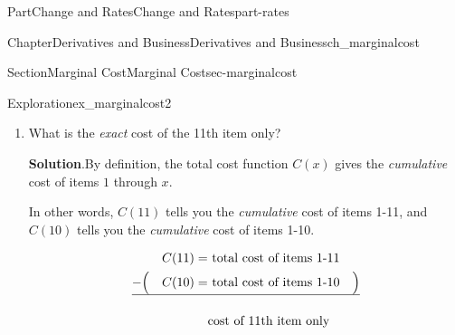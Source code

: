 \documentclass[oneside,10pt,]{tufte-book}
\newcommand{\blocktitlefont}{\relax}
\newcommand{\xreffont}{\relax}
\numberwithin{equation}{chapter}
\newcommand{\ddx}[1]{ \dfrac{d}{dx} \Big[ #1 \Big]  }
\newcommand{\amp}{&}
\begin{document}
\begin{partptx}{Part}{Change and Rates}{}{Change and Rates}{}{}{part-rates}
\begin{chapterptx}{Chapter}{Derivatives and Business}{}{Derivatives and Business}{}{}{ch_marginalcost}
\begin{sectionptx}{Section}{Marginal Cost}{}{Marginal Cost}{}{}{sec-marginalcost}
\begin{exploration}{Exploration}{}{ex_marginalcost2}
\begin{enumerate}[font=\bfseries,label=(\alph*),ref=\alph*]
\par\smallskip%
\noindent\textbf{\blocktitlefont Solution}.\hypertarget{ex_marginalcost2-2-2}{}\quad{}By \hyperref[defn_marginalcost]{Definition~{\xreffont\ref{defn_marginalcost}}}, when we are asked to \emph{approximate} the cost of the next item, we must find and use the marginal cost function.%
\par
To find the marginal cost function, use the derivative shortcuts%
\begin{align*}
C'(x) = \amp \ddx{ 120 + 5x - 0.1x^2 }\\
= \amp \ddx{120} + \ddx{5x} - \ddx{0.1x^2}\\
= \amp 0 + 5 - 0.1\cdot \ddx{x^2}\\
= \amp 5 - 0.1\cdot 2x\\
= \amp 5 - 0.2x
\end{align*}
%
\par
To use the marginal cost function, recall that%
\begin{equation*}
C'(x) = \text{ the APPROXIMATE cost of the NEXT item in \$/item }
\end{equation*}
We want to find the approximate cost of the 11th item. Item 11 is the item that is \emph{immediately after item 10}.%
\par
In other words, compute \(C'(10)\). That will tell us the approximate cost of the item \emph{after} 10, which is the 11th item.%
\begin{equation*}
C'(10) = 5 - 0.2\cdot 10 = 3
\end{equation*}
The 11th item will cost approximately 3\textdollar{}.%
\item{}What is the \emph{exact} cost of the 11th item only?%
\par\smallskip%
\noindent\textbf{\blocktitlefont Solution}.\hypertarget{ex_marginalcost2-3-2}{}\quad{}By definition, the total cost function \(C(x)\) gives the \emph{cumulative} cost of items \(1\) through \(x\).%
\par
In other words, \(C(11)\) tells you the \emph{cumulative} cost of items 1-11, and \(C(10)\) tells you the \emph{cumulative} cost of items 1-10.%
\par
%
\begin{align*}
\amp\amp C(11) = \amp \text{ total cost of items 1-11}  \amp \\
-\amp\Big(\amp C(10) = \amp \text{ total cost of items 1-10} \amp \Big) \\
\hline \\
\amp \amp \amp \text{cost of 11th item only} \amp 

\end{align*}
\end{enumerate}
\end{exploration}
\end{sectionptx}
\end{chapterptx}
\end{partptx}
\end{document}
